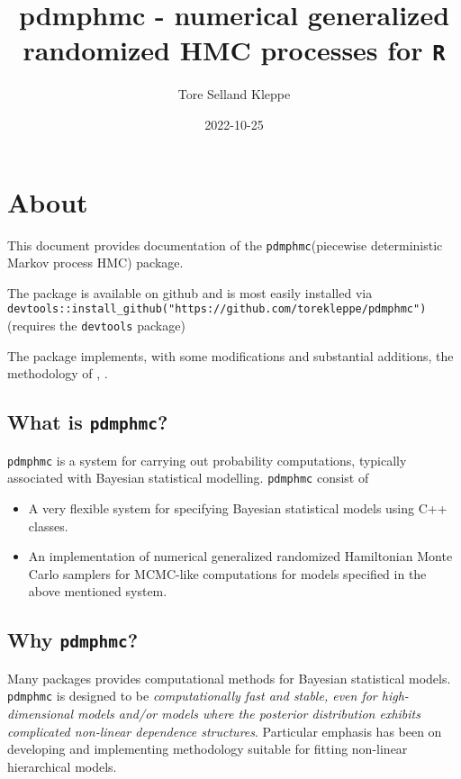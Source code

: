 \documentclass[
]{book}
\title{pdmphmc - numerical generalized randomized HMC processes for \texttt{R}}
\author{Tore Selland Kleppe}
\date{2022-10-25}
\begin{document}
\maketitle

{
\setcounter{tocdepth}{1}
\tableofcontents
}
\hypertarget{about}{%
\chapter{About}\label{about}}

This document provides documentation of the \texttt{pdmphmc}(piecewise deterministic Markov process HMC) package.

The package is available on github and is most easily installed via \texttt{devtools::install\_github("https://github.com/torekleppe/pdmphmc")} (requires the \texttt{devtools} package)

The package implements, with some modifications and substantial additions, the methodology of \citet{kleppe_CTHMC}, \citet{kleppe_amt}.

\hypertarget{what-is-pdmphmc}{%
\section{\texorpdfstring{What is \texttt{pdmphmc}?}{What is pdmphmc?}}\label{what-is-pdmphmc}}

\texttt{pdmphmc} is a system for carrying out probability computations, typically associated with Bayesian statistical modelling. \texttt{pdmphmc} consist of

\begin{itemize}
\item
  A very flexible system for specifying Bayesian statistical models using C++ classes.
\item
  An implementation of numerical generalized randomized Hamiltonian Monte Carlo samplers for MCMC-like computations for models specified in the above mentioned system.
\end{itemize}

\hypertarget{why-pdmphmc}{%
\section{\texorpdfstring{Why \texttt{pdmphmc}?}{Why pdmphmc?}}\label{why-pdmphmc}}

Many packages provides computational methods for Bayesian statistical models. \texttt{pdmphmc} is designed to be \emph{computationally fast and stable, even for high-dimensional models and/or models where the posterior distribution exhibits complicated non-linear dependence structures}. Particular emphasis has been on developing and implementing methodology suitable for fitting non-linear hierarchical models.
\end{document}
